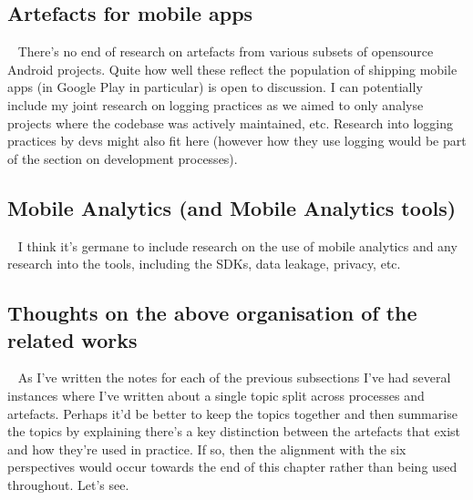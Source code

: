 \subsection{Artefacts for mobile apps}~\label{rw-artefacts-for-mobile-apps}
There's no end of research on artefacts from various subsets of opensource Android projects. Quite how well these reflect the population of shipping mobile apps (in Google Play in particular) is open to discussion. I can potentially include my joint research on logging practices as we aimed to only analyse projects where the codebase was actively maintained, etc. Research into logging practices by devs might also fit here (however how they use logging would be part of the section on development processes).

\subsection{Mobile Analytics (and Mobile Analytics tools)}~\label{rw-mobile-analytics-and-tools-topic}
I think it's germane to include research on the use of mobile analytics and any research into the tools, including the SDKs, data leakage, privacy, etc.

\subsection{Thoughts on the above organisation of the related works}~\label{rw-thoughts-on-organisation-of-the-rw}
As I've written the notes for each of the previous subsections I've had several instances where I've written about a single topic split across processes and artefacts. Perhaps it'd be better to keep the topics together and then summarise the topics by explaining there's a key distinction between the artefacts that exist and how they're used in practice. If so, then the alignment with the six perspectives would occur towards the end of this chapter rather than being used throughout. Let's see.

